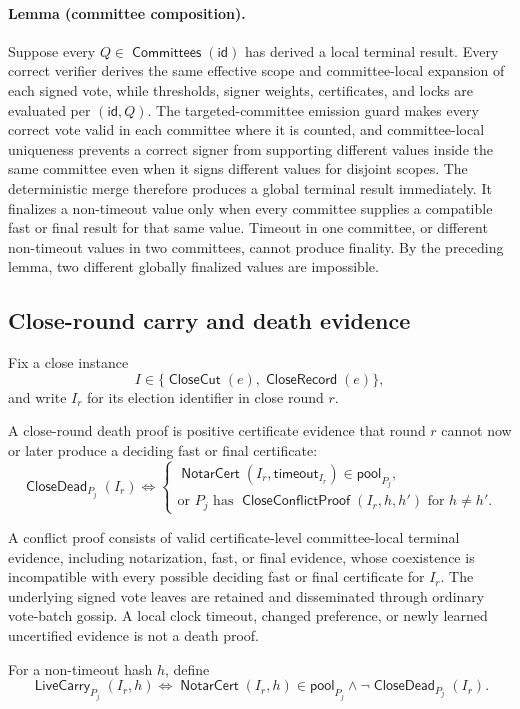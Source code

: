 \documentclass[sigplan,twocolumn,review,anonymous]{acmart}
\newcommand{\func}[1]{\operatorname{\mathsf{#1}}}
\newcommand{\NotarCert}{\func{NotarCert}}
\newcommand{\id}{\mathsf{id}}
\newcommand{\CloseCut}{\func{CloseCut}}
\newcommand{\CloseRecord}{\func{CloseRecord}}
\newcommand{\CloseDead}{\func{CloseDead}}
\newcommand{\LiveCarry}{\func{LiveCarry}}
\newcommand{\CloseConflictProof}{\func{CloseConflictProof}}
\newcommand{\timeoutVal}{\mathsf{timeout}}
\newcommand{\Committees}{\func{Committees}}
\begin{document}
\paragraph{Lemma (committee composition).}
Suppose every \(Q\in\Committees(\id)\) has derived a local terminal result.  Every correct verifier
derives the same effective scope and committee-local expansion of each signed vote, while thresholds,
signer weights, certificates, and locks are evaluated per \((\id,Q)\).  The targeted-committee emission
guard makes every correct vote valid in each committee where it is counted, and committee-local
uniqueness prevents a correct signer from supporting different values inside the same committee even
when it signs different values for disjoint scopes.  The deterministic merge therefore produces a
global terminal result immediately.  It finalizes a non-timeout value only when every committee supplies
a compatible fast or final result for that same value.  Timeout in one committee, or different
non-timeout values in two committees, cannot produce finality.  By the preceding lemma, two different
globally finalized values are impossible.

\subsection{Close-round carry and death evidence}

Fix a close instance
\[
I\in\{\CloseCut(e),\CloseRecord(e)\},
\]
and write \(I_r\) for its election identifier in close round \(r\).

A close-round death proof is positive certificate evidence that round \(r\) cannot now or later
produce a deciding fast or final certificate:
\[
\CloseDead_{P_j}(I_r)\iff
\begin{cases}
\NotarCert(I_r,\timeoutVal_{I_r})\in\mathsf{pool}_{P_j},\\
\text{or }P_j\text{ has }\CloseConflictProof(I_r,h,h')\text{ for }h\neq h'.
\end{cases}
\]

A conflict proof consists of valid certificate-level committee-local terminal evidence, including
notarization, fast, or final evidence, whose coexistence is incompatible with every possible deciding
fast or final certificate for \(I_r\).  The underlying signed vote leaves are retained and disseminated through ordinary vote-batch gossip.  A local clock timeout, changed preference, or newly learned
uncertified evidence is not a death proof.

For a non-timeout hash \(h\), define
\[
\LiveCarry_{P_j}(I_r,h)\iff
\NotarCert(I_r,h)\in\mathsf{pool}_{P_j}
\wedge
\neg\CloseDead_{P_j}(I_r).
\]
\end{document}
